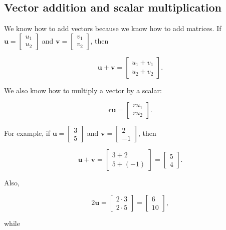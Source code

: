 \documentclass[
]{book}
\theoremstyle{definition}
\theoremstyle{definition}
\theoremstyle{definition}
\theoremstyle{definition}
\theoremstyle{remark}
\begin{document}
\subsection*{Vector addition and scalar multiplication}\label{vector-addition-and-scalar-multiplication}

We know how to add vectors because we know how to add matrices. If \(\mathbf{u}=\begin{bmatrix}u_1\\u_2\end{bmatrix}\) and \(\mathbf{v}=\begin{bmatrix}v_1\\v_2\end{bmatrix}\), then

\[\mathbf{u}+\mathbf{v}=\begin{bmatrix}u_1+v_1\\u_2+v_2\end{bmatrix}.\]

We also know how to multiply a vector by a scalar:

\[r\mathbf{u}=\begin{bmatrix} ru_1\\ru_2\end{bmatrix}.\]

For example, if \(\mathbf{u}=\begin{bmatrix}3\\5\end{bmatrix}\) and \(\mathbf{v}=\begin{bmatrix}2\\-1\end{bmatrix}\), then

\[\mathbf{u}+\mathbf{v}=\begin{bmatrix}3+2\\5+(-1)\end{bmatrix}=\begin{bmatrix}5\\4\end{bmatrix}.\]

Also,

\[2\mathbf{u}=\begin{bmatrix}2\cdot 3\\2\cdot 5\end{bmatrix}=\begin{bmatrix}6\\10\end{bmatrix},\]

while
\end{document}

